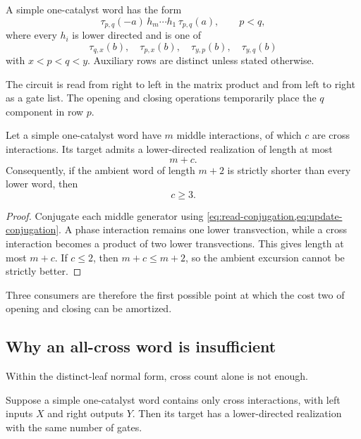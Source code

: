 \begin{definition}\label{def:simple-catalyst}
A simple one-catalyst word has the form
\[
\tau_{p,q}(-a)\,h_m\cdots h_1\,\tau_{p,q}(a),
\qquad p<q,
\]
where every $h_i$ is lower directed and is one of
\[
\tau_{q,x}(b),\quad \tau_{p,x}(b),\quad
\tau_{y,p}(b),\quad \tau_{y,q}(b)
\]
with $x<p<q<y$.  Auxiliary rows are distinct unless stated otherwise.
\end{definition}

The circuit is read from right to left in the matrix product and from left to right as a gate list.  The opening and closing operations temporarily place the $q$ component in row $p$.

\begin{proposition}\label{prop:cross-accounting}
Let a simple one-catalyst word have $m$ middle interactions, of which $c$ are cross interactions.  Its target admits a lower-directed realization of length at most
\[
m+c.
\]
Consequently, if the ambient word of length $m+2$ is strictly shorter than every lower word, then
\[
c\ge3.
\]
\end{proposition}

\begin{proof}
Conjugate each middle generator using \cref{eq:read-conjugation,eq:update-conjugation}.  A phase interaction remains one lower transvection, while a cross interaction becomes a product of two lower transvections.  This gives length at most $m+c$.  If $c\le2$, then $m+c\le m+2$, so the ambient excursion cannot be strictly better.
\end{proof}

Three consumers are therefore the first possible point at which the cost two of opening and closing can be amortized.

\subsection{Why an all-cross word is insufficient}

Within the distinct-leaf normal form, cross count alone is not enough.

\begin{lemma}\label{lem:all-cross-mirror}
Suppose a simple one-catalyst word contains only cross interactions, with left inputs $X$ and right outputs $Y$.  Then its target has a lower-directed realization with the same number of gates.
\end{lemma}

